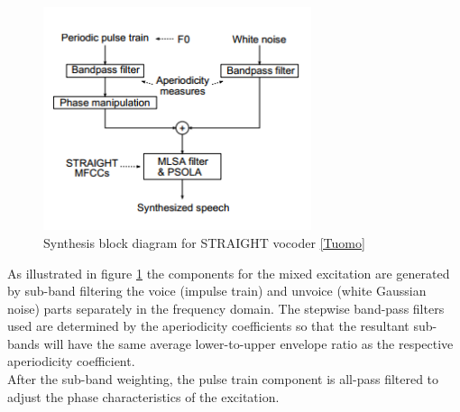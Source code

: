 \begin{figure}[!htb]
	\begin{center}
	\includegraphics[width=0.7\textwidth]{img/ssynb.png}
	\end{center}
	\caption{\label{ssynb}Synthesis block diagram for STRAIGHT vocoder \ref{Tuomo}}
\end{figure}
As illustrated in figure \ref{ssynb} the components for the mixed excitation are generated by sub-band filtering the voice (impulse train) and unvoice (white Gaussian noise) parts separately in the frequency domain. The stepwise band-pass filters used are determined by the aperiodicity coefficients so that the resultant sub-bands will have the same average lower-to-upper envelope ratio as the respective aperiodicity coefficient.\\
After the sub-band weighting, the pulse train component is all-pass filtered to adjust the phase characteristics of the excitation.